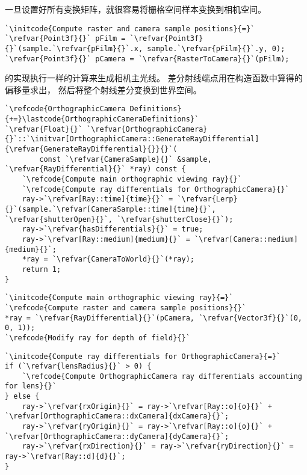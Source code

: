 一旦设置好所有变换矩阵，就很容易将栅格空间样本变换到相机空间。
\begin{lstlisting}
`\initcode{Compute raster and camera sample positions}{=}`
`\refvar{Point3f}{}` pFilm = `\refvar{Point3f}{}`(sample.`\refvar{pFilm}{}`.x, sample.`\refvar{pFilm}{}`.y, 0);
`\refvar{Point3f}{}` pCamera = `\refvar{RasterToCamera}{}`(pFilm);
\end{lstlisting}

的实现执行一样的计算来生成相机主光线。
差分射线端点用在构造函数中算得的偏移量求出，
然后将整个射线差分变换到世界空间。
\begin{lstlisting}
`\refcode{OrthographicCamera Definitions}{+=}\lastcode{OrthographicCameraDefinitions}`
`\refvar{Float}{}` `\refvar{OrthographicCamera}{}`::`\initvar[OrthographicCamera::GenerateRayDifferential]{\refvar{GenerateRayDifferential}{}}{}`(
        const `\refvar{CameraSample}{}` &sample, `\refvar{RayDifferential}{}` *ray) const {
    `\refcode{Compute main orthographic viewing ray}{}`
    `\refcode{Compute ray differentials for OrthographicCamera}{}`
    ray->`\refvar[Ray::time]{time}{}` = `\refvar{Lerp}{}`(sample.`\refvar[CameraSample::time]{time}{}`, `\refvar{shutterOpen}{}`, `\refvar{shutterClose}{}`);
    ray->`\refvar{hasDifferentials}{}` = true;
    ray->`\refvar[Ray::medium]{medium}{}` = `\refvar[Camera::medium]{medium}{}`;
    *ray = `\refvar{CameraToWorld}{}`(*ray);
    return 1;
}
\end{lstlisting}
\begin{lstlisting}
`\initcode{Compute main orthographic viewing ray}{=}`
`\refcode{Compute raster and camera sample positions}{}`
*ray = `\refvar{RayDifferential}{}`(pCamera, `\refvar{Vector3f}{}`(0, 0, 1));
`\refcode{Modify ray for depth of field}{}`
\end{lstlisting}
\begin{lstlisting}
`\initcode{Compute ray differentials for OrthographicCamera}{=}`
if (`\refvar{lensRadius}{}` > 0) {
    `\refcode{Compute OrthographicCamera ray differentials accounting for lens}{}`
} else {
    ray->`\refvar{rxOrigin}{}` = ray->`\refvar[Ray::o]{o}{}` + `\refvar[OrthographicCamera::dxCamera]{dxCamera}{}`;
    ray->`\refvar{ryOrigin}{}` = ray->`\refvar[Ray::o]{o}{}` + `\refvar[OrthographicCamera::dyCamera]{dyCamera}{}`;
    ray->`\refvar{rxDirection}{}` = ray->`\refvar{ryDirection}{}` = ray->`\refvar[Ray::d]{d}{}`;
}
\end{lstlisting}
